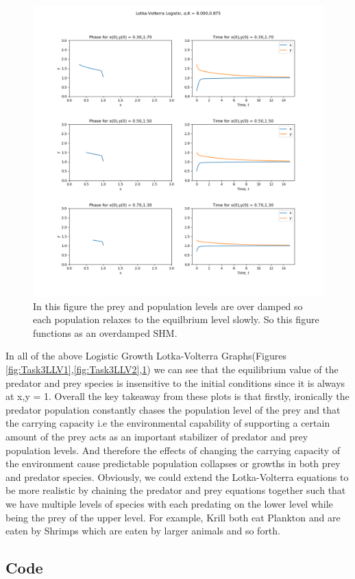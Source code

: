 \documentclass[11pt,a4paper]{CLabBookTemplate} %
\begin{document}
\begin{figure}[h!]
	\centering
	\includegraphics[width = 160mm]{Figures/Task3LLV3.png}
	\caption{In this figure the prey and population levels are over damped so each population relaxes to the equilbrium level slowly. So this figure functions as an overdamped SHM.}
	\label{fig:Task3LLV3}
\end{figure}
\clearpage

In all of the above Logistic Growth Lotka-Volterra Graphs(Figures \ref{fig:Task3LLV1},\ref{fig:Task3LLV2},\ref{fig:Task3LLV3}) we can see that the equilibrium value of the predator and prey species is insensitive to the initial conditions since it is always at x,y = 1. Overall the key takeaway from these plots is that firstly, ironically the predator population constantly chases the population level of the prey and that the carrying capacity i.e the environmental capability of supporting a certain amount of the prey acts as an important stabilizer of predator and prey population levels. And therefore the effects of changing the carrying capacity of the environment cause predictable population collapses or growths in both prey and predator species. 
\bigskip
Obviously, we could extend the Lotka-Volterra equations to be more realistic by chaining the predator and prey equations together such that we have multiple levels of species with each predating on the lower level while being the prey of the upper level. For example, Krill both eat Plankton and are eaten by Shrimps which are eaten by larger animals and so forth. 

\subsection{Code}

\clearpage
\printmybibliography
\end{document}
